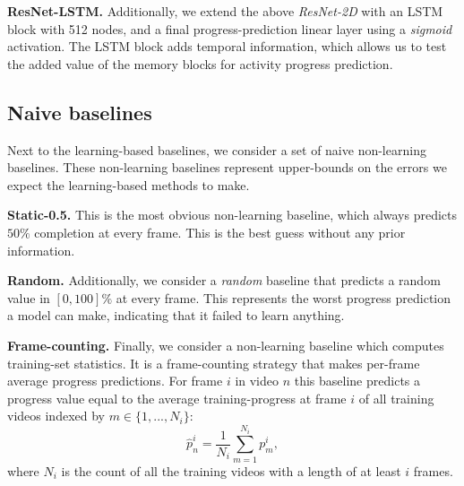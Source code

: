 \smallskip\noindent\textbf{ResNet-LSTM.} Additionally, we extend the above \textsl{ResNet-2D} with an LSTM block with 512 nodes, and a final progress-prediction linear layer using a \textsl{sigmoid} activation. 
The LSTM block adds temporal information, which allows us to test the added value of the memory blocks for activity progress prediction. 

\subsection{Naive baselines}
Next to the learning-based baselines, we consider a set of naive non-learning baselines. 
These non-learning baselines represent upper-bounds on the errors we expect the learning-based methods to make. 

\smallskip\noindent\textbf{Static-0.5.} This is the most obvious non-learning baseline, which always predicts $50\%$ completion at every frame. This is the best guess without any prior information.

\smallskip\noindent\textbf{Random.} Additionally, we consider a \textsl{random} baseline that predicts a random value in $[0, 100]\%$ at every frame. 
This represents the worst progress prediction a model can make, indicating that it failed to learn anything. 

\smallskip\noindent\textbf{Frame-counting.} Finally, we consider a non-learning baseline which computes training-set statistics.
It is a frame-counting strategy that makes per-frame average progress predictions. 
For frame $i$ in video $n$ this baseline predicts a progress value equal to the average training-progress at frame $i$ of all training videos indexed by $m \in \{1, ..., N_i\}$: 
\begin{equation}
  \hat{p}^i_n = \frac{1}{N_i}\sum_{m=1}^{N_i} p^i_m,
  \label{eq:pf_avg}
\end{equation}
where $N_i$ is the count of all the training videos with a length of at least $i$ frames. 
